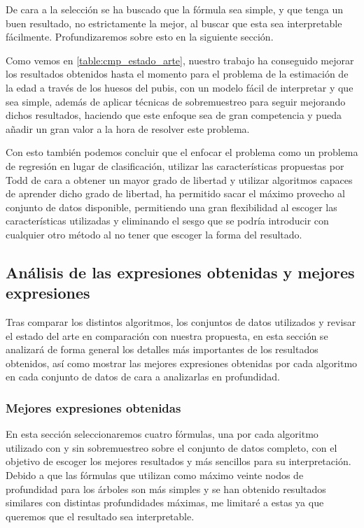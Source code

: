 De cara a la selección se ha buscado que la fórmula sea simple, y que tenga un buen resultado, no estrictamente la mejor, al buscar que esta sea interpretable fácilmente. Profundizaremos sobre esto en la siguiente sección.

Como vemos en \ref{table:cmp_estado_arte}, nuestro trabajo ha conseguido mejorar los resultados obtenidos hasta el momento para el problema de la estimación de la edad a través de los huesos del pubis, con un modelo fácil de interpretar y que sea simple, además de aplicar técnicas de sobremuestreo para seguir mejorando dichos resultados, haciendo que este enfoque sea de gran competencia y pueda añadir un gran valor a la hora de resolver este problema.

Con esto también podemos concluir que el enfocar el problema como un problema de regresión en lugar de clasificación, utilizar las características propuestas por Todd de cara a obtener un mayor grado de libertad y utilizar algoritmos capaces de aprender dicho grado de libertad, ha permitido sacar el máximo provecho al conjunto de datos disponible, permitiendo una gran flexibilidad al escoger las características utilizadas y eliminando el sesgo que se podría introducir con cualquier otro método al no tener que escoger la forma del resultado.


\subsection{Análisis de las expresiones obtenidas y mejores expresiones}


Tras comparar los distintos algoritmos, los conjuntos de datos utilizados y revisar el estado del arte en comparación con nuestra propuesta, en esta sección se analizará de forma general los detalles más importantes de los resultados obtenidos, así como mostrar las mejores expresiones obtenidas por cada algoritmo en cada conjunto de datos de cara a analizarlas en profundidad.

\subsubsection{Mejores expresiones obtenidas}

En esta sección seleccionaremos cuatro fórmulas, una por cada algoritmo utilizado con y sin sobremuestreo sobre el conjunto de datos completo, con el objetivo de escoger los mejores resultados y más sencillos para su interpretación. Debido a que las fórmulas que utilizan como máximo veinte nodos de profundidad para los árboles son más simples y se han obtenido resultados similares con distintas profundidades máximas, me limitaré a estas ya que queremos que el resultado sea interpretable.

